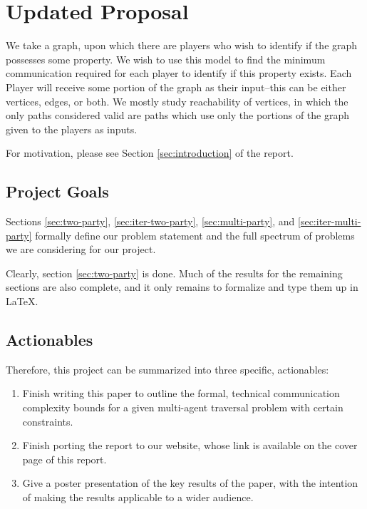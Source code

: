 
\section{Updated Proposal}

We take a graph, upon which there are players who wish to identify if the
graph possesses some property. We wish to use this model to find the minimum
communication required for each player to identify if this property exists.
Each Player will receive some portion of the graph as their input--this can be
either vertices, edges, or both. We mostly study reachability of vertices, in
which the only paths considered valid are paths which use only the portions of
the graph given to the players as inputs.

For motivation, please see Section \ref{sec:introduction} of the report.

\subsection{Project Goals}

Sections \ref{sec:two-party}, \ref{sec:iter-two-party}, \ref{sec:multi-party}, and \ref{sec:iter-multi-party} formally define our problem statement and the full spectrum of problems we are considering for our project.

Clearly, section \ref{sec:two-party} is done. Much of the results for the remaining sections are also complete, and it only remains to formalize and type them up in \LaTeX.

\subsection{Actionables}

Therefore, this project can be summarized into three specific, actionables:

\begin{enumerate}
    \item Finish writing this paper to outline the formal, technical communication complexity bounds for a given multi-agent traversal problem with certain constraints.
    \item Finish porting the report to our website, whose link is available on the cover page of this report.
    \item Give a poster presentation of the key results of the paper, with the intention of making the results applicable to a wider audience.
\end{enumerate}

